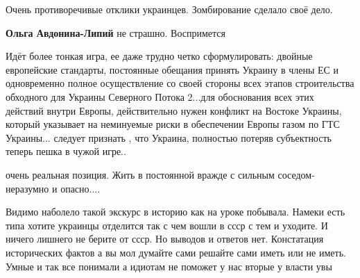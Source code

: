 \begin{itemize}
 

Очень противоречивые отклики украинцев. Зомбирование сделало своё дело.

\begin{itemize}
 
\textbf{Ольга Авдонина-Липий} не страшно. Воспримется
\end{itemize}

 

Идёт более тонкая игра, ее даже трудно четко сформулировать: двойные
европейские стандарты, постоянные обещания принять Украину в члены ЕС и
одновременно полное осуществление со своей стороны всех этапов строительства
обходного для Украины Северного Потока 2...для обоснования всех этих действий
внутри Европы, действительно нужен конфликт на Востоке Украины, который
указывает на неминуемые риски в обеспечении Европы газом по ГТС Украины...
следует признать , что Украина, полностью потеряв субъектность теперь пешка в
чужой игре..


 

очень реальная позиция. Жить в постоянной вражде с сильным соседом-неразумно и
опасно....

 

Видимо наболело такой экскурс в историю как на уроке побывала. Намеки есть типа
хотите украинцы отделится так с чем вошли в ссср с тем и уходите. И ничего
лишнего не берите от ссср. Но выводов и ответов нет. Констатация исторических
фактов а вы мол думайте сами решайте сами иметь или не иметь. Умные и так все
понимали а идиотам не поможет у нас вторые у власти увы


\end{itemize}
